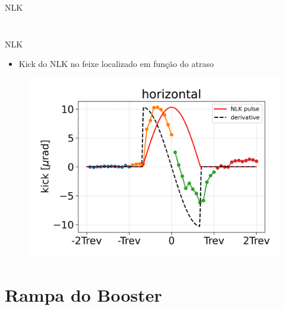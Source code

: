 \documentclass{beamer}					  %
\begin{document}
\begin{frame}{NLK}
\begin{columns}
\begin{column}{0.4\textwidth}
\begin{figure}[H]
                \label{fig:hcoil-table}
            \end{figure}
        \end{column}
    \end{columns}
\end{frame}

\begin{frame}{NLK}
    \vspace{0.2 cm}
    \begin{itemize}
            \item Kick do NLK no feixe localizado em função do atraso
    \end{itemize}
        \begin{figure}[H]
            \centering
            \includegraphics[width=1\textwidth]{2024-04-19/figures/hcoil-kick.png}
            \label{fig:hcoil-distortion}
        \end{figure}
\end{frame}


\section{Rampa do Booster}
\end{document}
